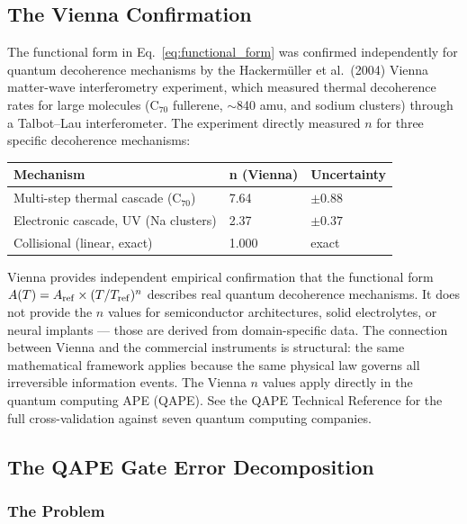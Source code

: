 \documentclass[12pt,a4paper]{article}
\begin{document}
\subsection{The Vienna Confirmation}

The functional form in Eq.~\eqref{eq:functional_form} was confirmed independently
for quantum decoherence mechanisms by the Hackerm\"{u}ller et al.\ (2004)
Vienna matter-wave interferometry experiment, which measured thermal decoherence
rates for large molecules (C$_{70}$ fullerene, $\sim$840 amu, and sodium clusters)
through a Talbot--Lau interferometer. The experiment directly measured $n$ for
three specific decoherence mechanisms:

\begin{center}
\begin{tabular}{lll}
\toprule
\textbf{Mechanism} & \textbf{n (Vienna)} & \textbf{Uncertainty} \\
\midrule
Multi-step thermal cascade (C$_{70}$) & 7.64 & $\pm 0.88$ \\
Electronic cascade, UV (Na clusters) & 2.37 & $\pm 0.37$ \\
Collisional (linear, exact) & 1.000 & exact \\
\bottomrule
\end{tabular}
\end{center}

Vienna provides independent empirical confirmation that the functional form
$A(T) = A_{\rm ref} \times (T/T_{\rm ref})^n$ describes real quantum decoherence
mechanisms. It does not provide the $n$ values for semiconductor architectures,
solid electrolytes, or neural implants --- those are derived from domain-specific
data. The connection between Vienna and the commercial instruments is structural:
the same mathematical framework applies because the same physical law governs all
irreversible information events. The Vienna $n$ values apply directly in the
quantum computing APE (QAPE). See the QAPE Technical Reference for the full
cross-validation against seven quantum computing companies.

\subsection{The QAPE Gate Error Decomposition}
\label{sec:qape_decomposition}

\subsubsection{The Problem}
\end{document}

